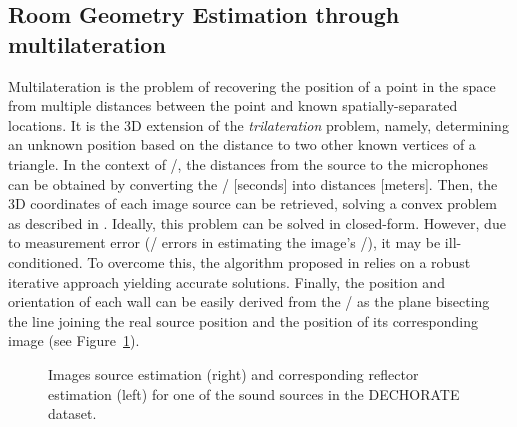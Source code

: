 \subsection{Room Geometry Estimation through multilateration}
Multilateration is the problem of recovering the position of a point in the space from multiple distances between the point and known spatially-separated locations.
It is the 3D extension of the \textit{trilateration} problem, namely, determining an unknown position based on the distance to two other known vertices of a triangle.
In the context of \RooGE/, the distances from the source to the microphones can be obtained by converting the \TOAs/ [seconds] into distances [meters].
Then, the 3D coordinates of each image source can be retrieved, solving a convex problem as described in .
Ideally, this problem can be solved in closed-form.
However, due to measurement error (\eg/ errors in estimating the image's \TOAs/), it may be ill-conditioned.
To overcome this, the algorithm proposed in  relies on a robust iterative approach yielding accurate solutions.
Finally, the position and orientation of each wall can be easily derived from the \ISM/ as the plane bisecting the line joining the real source position and the position of its corresponding image (see Figure~\ref{fig:dechorateapp:wall_rec}).

\begin{figure}[t]
    \begin{fullwidth}
    \centering
    \hfill
    \caption{Images source estimation (right) and corresponding reflector estimation (left) for one of the sound sources in the \acs{DECHORATE} dataset.}
    \label{fig:dechorateapp:wall_rec}
    \end{fullwidth}
\end{figure}

